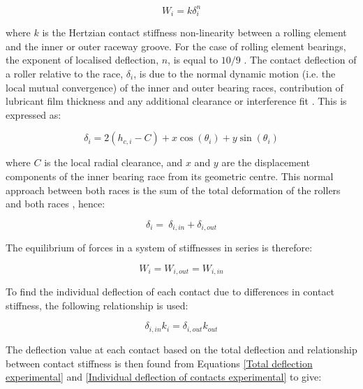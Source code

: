 \begin{equation}\label{Hertz load deflection}
	W_i=k \delta_i^n
\end{equation}

where $k$ is the Hertzian contact stiffness non-linearity between a rolling element and the inner or outer raceway groove. For the case of rolling element bearings, the exponent of localised deflection, $n$, is equal to $10/9$ \cite{Harris1984}. The contact deflection of a roller relative to the race, $\delta_i$, is due to the normal dynamic motion (i.e. the local mutual convergence) of the inner and outer bearing races, contribution of lubricant film thickness and any additional clearance or interference fit \cite{Mohammadpour2015c}. This is expressed as:

\begin{equation}\label{Contact deflection experimental}
	\delta_i=2\left(h_{c,i}-C\right)+x\cos{\left(\theta_i\right)}+y\sin(\theta_i)
\end{equation}

where $C$ is the local radial clearance, and $x$ and $y$ are the displacement components of the inner bearing race from its geometric centre. This normal approach between both races is the sum of the total deformation of the rollers and both races \cite{Hamrock1981}, hence:

\begin{equation}\label{Total deflection experimental}
\delta_i=\ \delta_{i,in}+\delta_{i,out}
\end{equation}

The equilibrium of forces in a system of stiffnesses in series is therefore:

\begin{equation}\label{Equilibrium of force experimental}
W_i=W_{i,out}=W_{i,in}
\end{equation}

To find the individual deflection of each contact due to differences in contact stiffness, the following relationship is used:

\begin{equation}\label{Individual deflection of contacts experimental}
{\delta_{i,in}}k_i={\delta_{i,out}}k_{out}
\end{equation}

The deflection value at each contact based on the total deflection and relationship between contact stiffness is then found from Equations \ref{Total deflection experimental} and \ref{Individual deflection of contacts experimental} to give:


